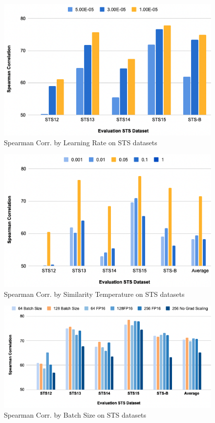 \documentclass[10pt,twocolumn,letterpaper]{article}
\begin{document}
\begin{appendices}
\begin{figure}[hbt!]
\centering
\includegraphics[scale=0.3]{images/Results-Evaluation-Score-by-Learning-Rate.png}
\caption{Spearman Corr. by Learning Rate on STS datasets}
\label{fig:short}
\end{figure}

\begin{figure}[hbt!]
\centering
\includegraphics[scale=0.30]{images/Results-Evaluation-Score-by-Temp.png}
\caption{Spearman Corr. by Similarity Temperature on STS datasets}
\label{fig:short}
\end{figure}

\begin{figure}[hbt!]
\centering
\includegraphics[scale=0.30]{images/Results-Evaluation-Score-by-Batch-Size.png}
\caption{Spearman Corr. by Batch Size on STS datasets}
\label{fig:short}
\end{figure}


\end{appendices}
\end{document}

